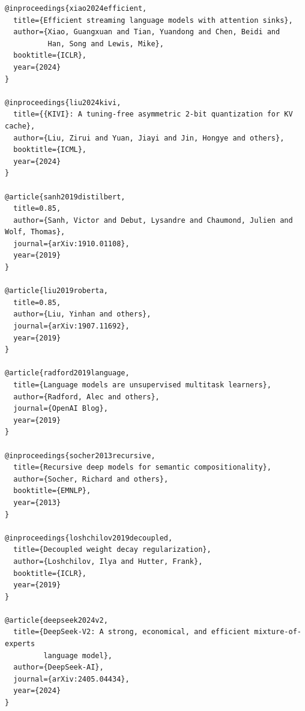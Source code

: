 \begin{lstlisting}
@inproceedings{xiao2024efficient,
  title={Efficient streaming language models with attention sinks},
  author={Xiao, Guangxuan and Tian, Yuandong and Chen, Beidi and 
          Han, Song and Lewis, Mike},
  booktitle={ICLR},
  year={2024}
}

@inproceedings{liu2024kivi,
  title={{KIVI}: A tuning-free asymmetric 2-bit quantization for KV cache},
  author={Liu, Zirui and Yuan, Jiayi and Jin, Hongye and others},
  booktitle={ICML},
  year={2024}
}

@article{sanh2019distilbert,
  title=0.85,
  author={Sanh, Victor and Debut, Lysandre and Chaumond, Julien and Wolf, Thomas},
  journal={arXiv:1910.01108},
  year={2019}
}

@article{liu2019roberta,
  title=0.85,
  author={Liu, Yinhan and others},
  journal={arXiv:1907.11692},
  year={2019}
}

@article{radford2019language,
  title={Language models are unsupervised multitask learners},
  author={Radford, Alec and others},
  journal={OpenAI Blog},
  year={2019}
}

@inproceedings{socher2013recursive,
  title={Recursive deep models for semantic compositionality},
  author={Socher, Richard and others},
  booktitle={EMNLP},
  year={2013}
}

@inproceedings{loshchilov2019decoupled,
  title={Decoupled weight decay regularization},
  author={Loshchilov, Ilya and Hutter, Frank},
  booktitle={ICLR},
  year={2019}
}

@article{deepseek2024v2,
  title={DeepSeek-V2: A strong, economical, and efficient mixture-of-experts 
         language model},
  author={DeepSeek-AI},
  journal={arXiv:2405.04434},
  year={2024}
}
\end{lstlisting}